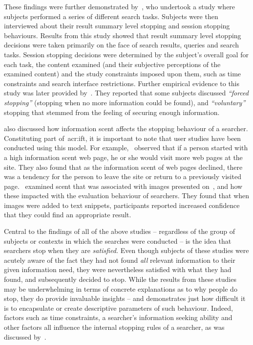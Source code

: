 These findings were further demonstrated by~\cite{wu2014information_scent}, who undertook a study where subjects performed a series of different search tasks. Subjects were then interviewed about their result summary level stopping and session stopping behaviours. Results from this study showed that result summary level stopping decisions were taken primarily on the face of search results, queries and search tasks. Session stopping decisions were determined by the subject's overall goal for each task, the content examined (and their subjective perceptions of the examined content) and the study constraints imposed upon them, such as time constraints and search interface restrictions. Further empirical evidence to this study was later provided by~\cite{wu2014stopping_query_abandonment}. They reported that some subjects discussed \emph{``forced stopping''} (stopping when no more information could be found), and \emph{``voluntary''} stopping that stemmed from the feeling of securing enough information.

\cite{wu2014information_scent} also discussed how information scent affects the stopping behaviour of a searcher. Constituting part of~\gls{acr:ift}, it is important to note that user studies have been conducted using this model. For example,~\cite{card2001scent_graphs} observed that if a person started with a high information scent web page, he or she would visit more web pages at the site. They also found that as the information scent of web pages declined, there was a tendency for the person to leave the site or return to a previously visited page.~\cite{loumakis2011image_smells} examined scent that was associated with images presented on~, and how these impacted with the evaluation behaviour of searchers. They found that when images were added to text snippets, participants reported increased confidence that they could find an appropriate result.

Central to the findings of all of the above studies -- regardless of the group of subjects or contexts in which the searches were conducted -- is the idea that searchers stop when they are \emph{satisfied.} Even though subjects of these studies were acutely aware of the fact they had not found \emph{all} relevant information to their given information need, they were nevertheless satisfied with what they had found, and subsequently decided to stop. While the results from these studies may be underwhelming in terms of concrete explanations as to why people do stop, they do provide invaluable insights -- and demonstrates just how difficult it is to encapsulate or create descriptive parameters of such behaviour. Indeed, factors such as time constraints, a searcher's information seeking ability and other factors all influence the internal stopping rules of a searcher, as was discussed by~\cite{marchionini1995information_seeking}. 

